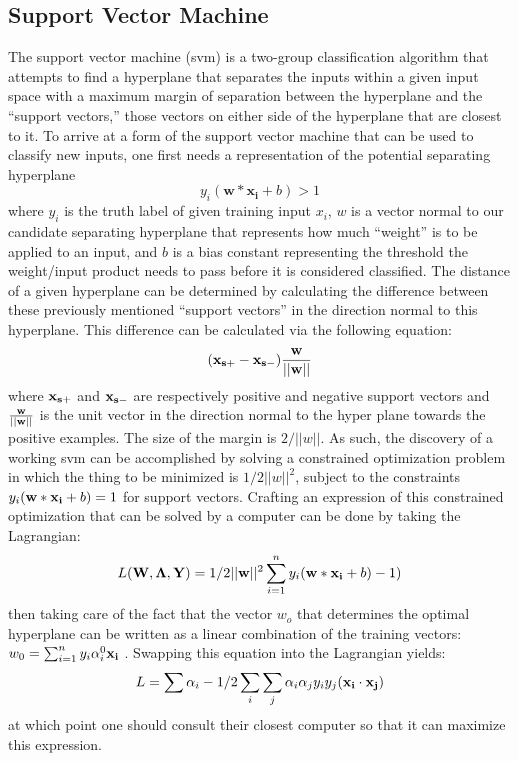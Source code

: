 \subsection{Support Vector Machine}
The support vector machine (svm) is a two-group classification algorithm that attempts
to find a hyperplane that separates the inputs within a given input space
with a maximum margin of separation between the hyperplane and the
``support vectors,'' those vectors on either side of the hyperplane
that are closest to it. To arrive at a form of the support vector machine that
can be used to classify new inputs, one first needs a representation of the
potential separating hyperplane $$y_i(\mathbf{w}*\mathbf{x_i} + b) > 1$$ where
$y_i$ is the truth label of given training input $x_i$, $w$ is a vector
normal to our candidate separating hyperplane that represents how much
``weight'' is to be applied to an input, and $b$ is a bias constant representing
the threshold the weight/input product needs to pass before it is considered
classified. The distance of a given hyperplane can be determined by calculating
the difference between these previously mentioned ``support vectors'' in the
direction normal to this hyperplane. This difference can be calculated via the
following equation:
$$(\bold{x_{s+}}-\bold{x_{s-}})\bold{\frac{w}{||w||}}$$ where $\bold{x_{s+}}$
and $\bold{x_{s-}}$ are respectively positive and negative support vectors and
$\bold{\frac{w}{||w||}}$ is the unit vector in the direction normal to the hyper
plane towards the positive examples. The size of the margin is $2/||w||$. As
such, the discovery of a working svm can be accomplished by solving a constrained
optimization problem in which the thing to be minimized is $1/2||w||^2$, subject
to the constraints $y_i(\bold{w}*\bold{x_i} + b) = 1$ for support vectors.
Crafting an expression of this constrained optimization that can be solved by a
computer can be done by taking the Lagrangian:
$$L(\bold{W},\bold{\Lambda}, \bold{Y}) = 1/2||\bold{w}||^2 \sum_{i=1}^{n}y_i(\bold{w}*\bold{x_i}+b)-1)$$
then taking care of the fact that the vector $w_o$ that determines the optimal
hyperplane can be written as a linear combination of the training vectors:
$w_{0}=\sum_{i=1}^{n}y_{i}\alpha_{i}^{0}\bold{x_i}$ \cite{Vapnik}. Swapping this
equation into the Lagrangian yields:
$$L = \sum \alpha_{i} - 1/2 \sum_{i}\sum_{j}\alpha_{i}\alpha_{j}y_{i}y_{j}(\bold{x_i}\cdot\bold{x_j})$$
at which point one should consult their closest computer so that it can maximize
this expression.


